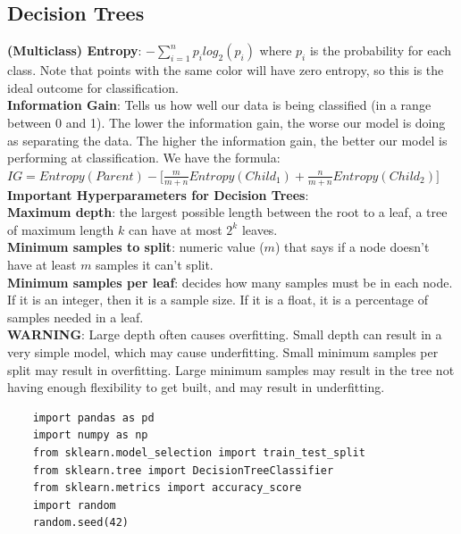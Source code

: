\documentclass[11pt, a4paper]{article}
\begin{document}
\begin{spacing}{1.1}
	\subsection{Decision Trees}
	\textbf{(Multiclass) Entropy}: $-\sum_{i=1}^np_i log_2(p_i)$ where $p_i$ is the probability for each class. Note that points with the same color will have zero entropy, so this is the ideal outcome for classification. \vspace*{2mm}\\
	\textbf{Information Gain}: Tells us how well our data is being classified (in a range between 0 and 1). The lower the information gain, the worse our model is doing as separating the data. The higher the information gain, the better our model is performing at classification. We have the formula: \\$IG = Entropy(Parent) - \Big[\frac{m}{m+n}Entropy(Child_1)+\frac{n}{m+n}Entropy(Child_2)\Big]$ \vspace*{2mm}\\
	\textbf{Important Hyperparameters for Decision Trees}: \vspace*{1mm} \\
	\textbf{Maximum depth}: the largest possible length between the root to a leaf, a tree of maximum length $k$ can have at most $2^k$ leaves. \vspace*{2mm}\\
	\textbf{Minimum samples to split}: numeric value ($m$) that says if a node doesn't have at least $m$ samples it can't split.\vspace*{2mm}\\
	\textbf{Minimum samples per leaf}: decides how many samples must be in each node. If it is an integer, then it is a sample size. If it is a float, it is a percentage of samples needed in a leaf. \vspace*{2mm}\\
	\textbf{WARNING}: Large depth often causes overfitting. Small depth can result in a very simple model, which may cause underfitting. Small minimum samples per split may result in overfitting. Large minimum samples may result in the tree not having enough flexibility to get built, and may result in underfitting. \newpage

	\begin{lstlisting}
	import pandas as pd
	import numpy as np
	from sklearn.model_selection import train_test_split
	from sklearn.tree import DecisionTreeClassifier
	from sklearn.metrics import accuracy_score
	import random
	random.seed(42)
	

\end{lstlisting}
\end{spacing}
\end{document}
